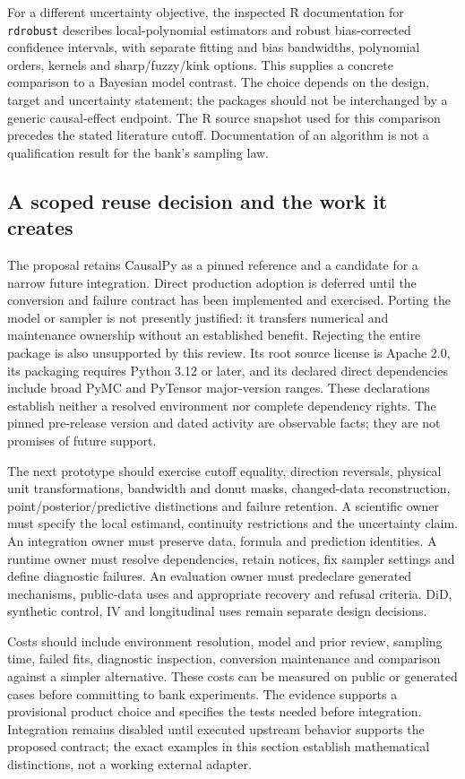For a different uncertainty objective, the inspected R documentation for
\texttt{rdrobust} describes local-polynomial estimators and robust bias-corrected
confidence intervals, with separate fitting and bias bandwidths, polynomial
orders, kernels and sharp/fuzzy/kink options. This supplies a concrete comparison
to a Bayesian model contrast. The choice depends on the design, target and
uncertainty statement; the packages should not be interchanged by a generic
causal-effect endpoint. The R source snapshot used for this comparison
precedes the stated literature cutoff. Documentation of an algorithm is not a
qualification result for the bank's sampling law.\citep{v12_sw_rdrobust}

\subsection{A scoped reuse decision and the work it creates}

The proposal retains CausalPy as a pinned reference and a candidate for a narrow
future integration. Direct production adoption is deferred until the conversion
and failure contract has been implemented and exercised. Porting the model or
sampler is not presently justified: it transfers numerical and maintenance
ownership without an established benefit. Rejecting the entire package is also
unsupported by this review. Its root source license is Apache 2.0, its packaging
requires Python 3.12 or later, and its declared direct dependencies include broad
PyMC and PyTensor major-version ranges. These declarations establish neither a
resolved environment nor complete dependency rights. The pinned pre-release
version and dated activity are observable facts; they are not promises of future
support.\citep{exec14_causalpy_primary,exec14_causalpy_decision}

The next prototype should exercise cutoff equality, direction reversals, physical
unit transformations, bandwidth and donut masks, changed-data reconstruction,
point/posterior/predictive distinctions and failure retention. A scientific owner
must specify the local estimand, continuity restrictions and the uncertainty
claim. An integration owner must preserve data, formula and prediction identities.
A runtime owner must resolve dependencies, retain notices, fix sampler settings
and define diagnostic failures. An evaluation owner must predeclare generated
mechanisms, public-data uses and appropriate recovery and refusal criteria.
DiD, synthetic control, IV and longitudinal uses remain separate design decisions.
\citep{exec14_causalpy_decision}

Costs should include environment resolution, model and prior review, sampling
time, failed fits, diagnostic inspection, conversion maintenance and comparison
against a simpler alternative. These costs can be measured on public or generated
cases before committing to bank experiments. The evidence supports a provisional product choice and specifies the tests needed before integration. Integration
remains disabled until executed upstream behavior supports the proposed contract;
the exact examples in this section establish mathematical distinctions, not a
working external adapter.\citep{exec14_causalpy_decision}
\label{exec14:causalpy-contract-end}

